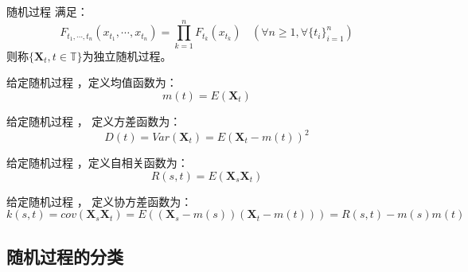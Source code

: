         \begin{definition}[独立随机过程]
            随机过程 \StochasticProcess 满足：
            $$
            F_{t_1, \cdots, t_n}(x_{t_1}, \cdots, x_{t_n}) = \prod_{k=1}^{n} F_{t_k}(x_{t_k})\ \ \ \ (\forall n \geq 1, \forall \{t_i\}_{i=1}^{n})
            $$
            则称$\{\textbf{X}_t, t \in \mathbb{T}\}$为独立随机过程。
        \end{definition}

        \begin{definition}[均值函数]
            给定随机过程 \StochasticProcess，定义均值函数为：
            $$
            m(t) = E(\textbf{X}_t)
            $$
        \end{definition}

        \begin{definition}[方差函数]
            给定随机过程 \StochasticProcess， 定义方差函数为：
            $$
            D(t) = Var(\textbf{X}_t) = E{\left(\textbf{X}_t - m(t)\right)}^2
            $$
        \end{definition}

        \begin{definition}[自相关函数]
            给定随机过程 \StochasticProcess，定义自相关函数为：
            $$
            R(s, t) = E(\textbf{X}_s\textbf{X}_t)
            $$
        \end{definition}

        \begin{definition}[协方差函数]
            给定随机过程 \StochasticProcess， 定义协方差函数为：
            $$
            k(s, t) = cov(\textbf{X}_s \textbf{X}_t) = E((\textbf{X}_s - m(s))(\textbf{X}_t - m(t))) = R(s, t) - m(s)m(t)
            $$
        \end{definition}
    \subsection{随机过程的分类}
        \begin{definition}
            
        \end{definition}